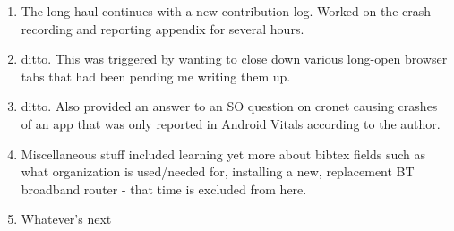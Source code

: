 \begin{enumerate}
    \item The long haul continues with a new contribution log. Worked on the crash recording and reporting appendix for several hours.
    \item ditto. This was triggered by wanting to close down various long-open browser tabs that had been pending me writing them up.
    \item ditto. Also provided an answer to an SO question on cronet causing crashes of an app that was only reported in Android Vitals according to the author.
    \item Miscellaneous stuff included learning yet more about bibtex fields such as what organization is used/needed for, installing a new, replacement BT broadband router - that time is excluded from here.
    \item Whatever's next

\end{enumerate}